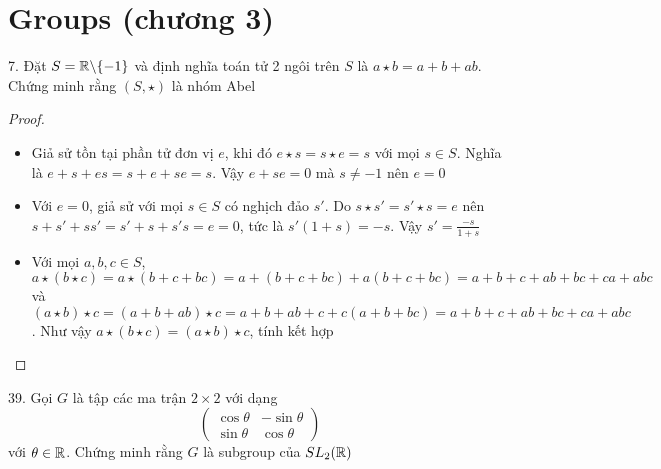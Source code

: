 \section{Groups (chương 3)}

7. Đặt $S = \mathbb{R} \backslash \{-1\}$ và định nghĩa toán tử 2 ngôi trên $S$ là $a \star b = a + b + ab$. Chứng minh rằng $(S, \star)$ là nhóm Abel

\begin{proof}
    \begin{itemize}
        \item Giả sử tồn tại phần tử đơn vị $e$, khi đó $e \star s = s \star e = s$ với mọi $s \in S$. Nghĩa là $e + s + es = s + e + se = s$. Vậy $e + se = 0$ mà $s \neq -1$ nên $e = 0$
        \item Với $e = 0$, giả sử với mọi $s \in S$ có nghịch đảo $s'$. Do $s \star s' = s' \star s = e$ nên $s + s' + ss' = s' + s + s's = e = 0$, tức là $s'(1 + s) = -s$. Vậy $s' = \frac{-s}{1 + s}$
        \item Với mọi $a, b, c \in S$, $a \star (b \star c) = a \star (b + c + bc) = a + (b+c+bc) + a (b+c+bc) = a + b + c + ab + bc + ca + abc$ và $(a \star b) \star c = (a + b + ab) \star c = a + b + ab + c + c(a+b+bc) = a + b + c + ab + bc + ca + abc$. Như vậy $a \star (b \star c) = (a \star b) \star c$, tính kết hợp
    \end{itemize}
\end{proof}

39. Gọi $G$ là tập các ma trận $2 \times 2$ với dạng
$$\begin{pmatrix}
    \cos \theta & -\sin \theta \\ \sin \theta & \cos \theta
\end{pmatrix}$$ với $\theta \in \mathbb{R}$. Chứng minh rằng $G$ là subgroup của $SL_2 (\mathbb{R})$
    
